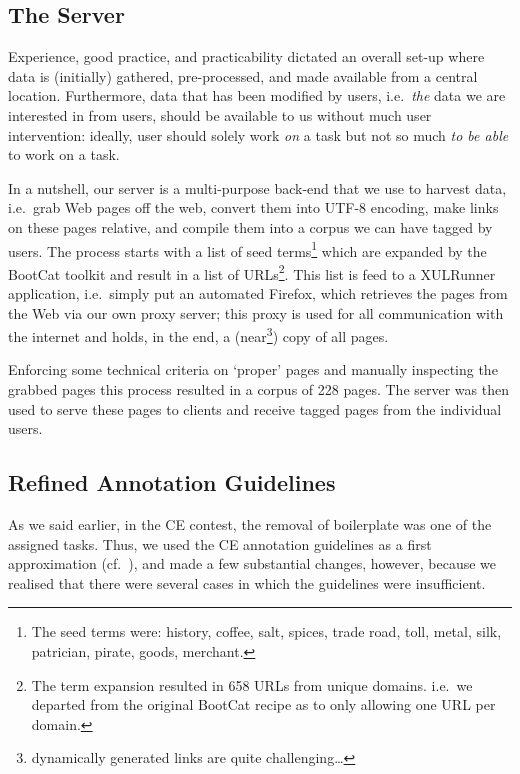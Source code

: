 \documentclass[12pt]{article}
\begin{document}
\subsection{The Server}
Experience, good practice, and practicability dictated an overall set-up where data is (initially) gathered, pre-processed, and made available from a central location. Furthermore, data that has been modified by users, i.e.~\textit{the} data we are interested in from users, should be available to us without much user intervention: ideally, user should solely work \textit{on} a task but not so much \textit{to be able} to work on a task.  

In a nutshell, our server is a multi-purpose back-end that we use to harvest data, i.e.~grab Web pages off the web, convert them into UTF-8 encoding\cite{unicode.org}, make links on these pages relative\cite{w3.org/base}, and compile them into a corpus we can have tagged by users. The process starts with a list of seed terms\footnote{The seed terms were: history, coffee, salt, spices, trade road, toll, metal, silk, patrician, pirate, goods, merchant.} which are expanded by the BootCat toolkit\cite{BaroniSilvia2004} and result in a list of URLs\footnote{The term expansion resulted in 658 URLs from unique domains. i.e.~we departed from the original BootCat recipe as to only allowing one URL per domain.}. This list is feed to a XULRunner application\cite{xulrunner}, i.e.~simply put an automated Firefox\cite{firefox}, which retrieves the pages from the Web via our own proxy server\cite{wwwoffle}; this proxy is used for all communication with the internet and holds, in the end, a (near\footnote{dynamically generated links are quite challenging\ldots}) copy of all pages. 

Enforcing some technical criteria on `proper' pages and manually inspecting the grabbed pages this process resulted in a corpus of 228 pages. The server was then used to serve these pages to clients and receive tagged pages from the individual users.


\subsection{Refined Annotation Guidelines\footnotemark}

As we said earlier, in the CE contest, the removal of boilerplate was one of the assigned tasks. Thus, we used the CE annotation guidelines as a first approximation (cf.~\cite{cleaneval/annotation_guidelines}), and made a few substantial changes, however, because we realised that there were several cases in which the guidelines were insufficient.
\end{document}
